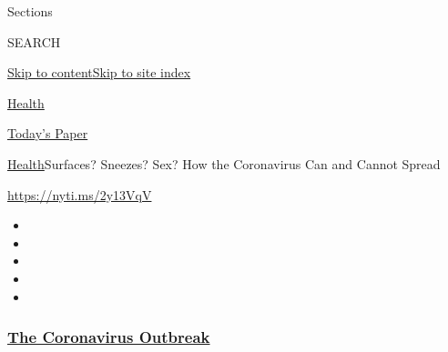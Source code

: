 Sections

SEARCH

\protect\hyperlink{site-content}{Skip to
content}\protect\hyperlink{site-index}{Skip to site index}

\href{https://www.nytimes3xbfgragh.onion/section/health}{Health}

\href{https://myaccount.nytimes3xbfgragh.onion/auth/login?response_type=cookie\&client_id=vi}{}

\href{https://www.nytimes3xbfgragh.onion/section/todayspaper}{Today's
Paper}

\href{/section/health}{Health}\textbar{}Surfaces? Sneezes? Sex? How the
Coronavirus Can and Cannot Spread

\url{https://nyti.ms/2y13VqV}

\begin{itemize}
\item
\item
\item
\item
\item
\end{itemize}

\hypertarget{the-coronavirus-outbreak}{%
\subsubsection{\texorpdfstring{\href{https://www.nytimes3xbfgragh.onion/news-event/coronavirus?name=styln-coronavirus-national\&region=TOP_BANNER\&variant=undefined\&block=storyline_menu_recirc\&action=click\&pgtype=Article\&impression_id=b3a482c0-e385-11ea-81c2-73c867635f43}{The
Coronavirus
Outbreak}}{The Coronavirus Outbreak}}\label{the-coronavirus-outbreak}}

